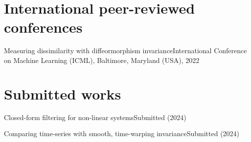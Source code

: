 
\section*{International peer-reviewed conferences}

{Measuring dissimilarity with diffeormorphism invariance}{International Conference on Machine Learning (ICML), Baltimore, Maryland (USA), 2022}

\section*{Submitted works}

{Closed-form filtering for non-linear systems}{Submitted (2024)}
\medskip

{Comparing time-series with smooth, time-warping invariance}{Submitted (2024)}
